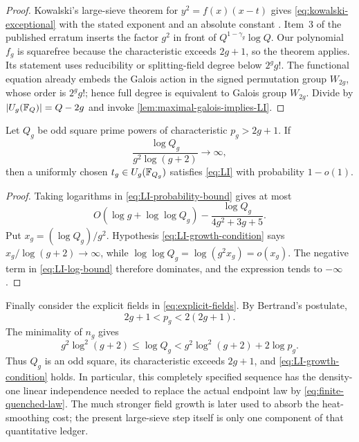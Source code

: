 \begin{proof}
Kowalski's large-sieve theorem for
\(y^2=f(x)(x-t)\) gives \eqref{eq:kowalski-exceptional} with the stated
exponent and an absolute constant
\cite[Theorem~6.2]{Kowalski2006}.  Item~3 of the published erratum
\cite{KowalskiErratum} inserts the factor \(g^2\) in front of
\(Q^{1-\gamma_g}\log Q\).  Our polynomial \(f_g\) is squarefree because the
characteristic exceeds \(2g+1\), so the theorem applies.  Its statement uses
reducibility or splitting-field degree below \(2^gg!\).  The functional
equation already embeds the Galois action in the signed permutation group
\(W_{2g}\), whose order is \(2^gg!\); hence full degree is equivalent to
Galois group \(W_{2g}\).  Divide by
\(\lvert U_g(\mathbb F_Q)\rvert=Q-2g\) and invoke
\cref{lem:maximal-galois-implies-LI}.
\end{proof}

\begin{corollary}
\label{cor:simultaneous-LI}
Let \(Q_g\) be odd square prime powers of characteristic \(p_g>2g+1\).  If
\begin{equation}
 \frac{\log Q_g}{g^2\log(g+2)}\longrightarrow\infty,
\label{eq:LI-growth-condition}
\end{equation}
then a uniformly chosen \(t_g\in U_g(\mathbb F_{Q_g})\) satisfies \eqref{eq:LI}
with probability \(1-o(1)\).
\end{corollary}

\begin{proof}
Taking logarithms in \eqref{eq:LI-probability-bound} gives at most
\begin{equation}
 O(\log g+\log\log Q_g)
 -\frac{\log Q_g}{4g^2+3g+5}.
\label{eq:LI-log-bound}
\end{equation}
Put \(x_g=(\log Q_g)/g^2\).  Hypothesis
\eqref{eq:LI-growth-condition} says \(x_g/\log(g+2)\to\infty\), while
\(\log\log Q_g=\log(g^2x_g)=o(x_g)\).  The negative term in
\eqref{eq:LI-log-bound} therefore dominates, and the expression tends to
\(-\infty\).
\end{proof}

Finally consider the explicit fields in \eqref{eq:explicit-fields}.  By
Bertrand's postulate,
\[
 2g+1<p_g<2(2g+1).
\]
The minimality of \(n_g\) gives
\begin{equation}
 g^2\log^2(g+2)\leq\log Q_g
 <g^2\log^2(g+2)+2\log p_g.
\label{eq:explicit-field-growth}
\end{equation}
Thus \(Q_g\) is an odd square, its characteristic exceeds \(2g+1\), and
\eqref{eq:LI-growth-condition} holds.  In particular, this completely
specified sequence has the density-one linear independence needed to replace
the actual endpoint law by \eqref{eq:finite-quenched-law}.  The much stronger
field growth is later used to absorb the heat-smoothing cost; the present
large-sieve step itself is only one component of that quantitative ledger.
